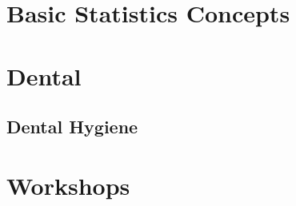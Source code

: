 \documentclass[
]{book}
\begin{document}
\hypertarget{basic-statistics-concepts}{%
\chapter{Basic Statistics Concepts}\label{basic-statistics-concepts}}

\hypertarget{dental}{%
\chapter{Dental}\label{dental}}

\hypertarget{dental-hygiene}{%
\section{Dental Hygiene}\label{dental-hygiene}}

\hypertarget{workshops}{%
\chapter{Workshops}\label{workshops}}

  
\end{document}
